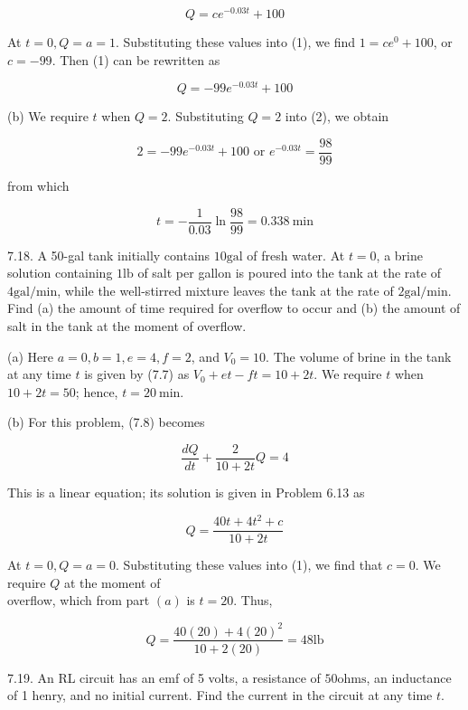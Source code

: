 \documentclass[10pt]{article}
\begin{document}
\begin{equation*}
Q=c e^{-0.03 t}+100 \tag{1}
\end{equation*}


At $t=0, Q=a=1$. Substituting these values into (1), we find $1=c e^{0}+100$, or $c=-99$. Then (1) can be rewritten as


\begin{equation*}
Q=-99 e^{-0.03 t}+100 \tag{2}
\end{equation*}


(b) We require $t$ when $Q=2$. Substituting $Q=2$ into (2), we obtain

$$
2=-99 e^{-0.03 t}+100 \text { or } e^{-0.03 t}=\frac{98}{99}
$$

from which

$$
t=-\frac{1}{0.03} \ln \frac{98}{99}=0.338 \mathrm{~min}
$$

7.18. A 50-gal tank initially contains $10 \mathrm{gal}$ of fresh water. At $t=0$, a brine solution containing $1 \mathrm{lb}$ of salt per gallon is poured into the tank at the rate of $4 \mathrm{gal} / \mathrm{min}$, while the well-stirred mixture leaves the tank at the rate of $2 \mathrm{gal} / \mathrm{min}$. Find (a) the amount of time required for overflow to occur and (b) the amount of salt in the tank at the moment of overflow.

(a) Here $a=0, b=1, e=4, f=2$, and $V_{0}=10$. The volume of brine in the tank at any time $t$ is given by (7.7) as $V_{0}+e t-f t=10+2 t$. We require $t$ when $10+2 t=50$; hence, $t=20 \mathrm{~min}$.

(b) For this problem, (7.8) becomes

$$
\frac{d Q}{d t}+\frac{2}{10+2 t} Q=4
$$

This is a linear equation; its solution is given in Problem 6.13 as


\begin{equation*}
Q=\frac{40 t+4 t^{2}+c}{10+2 t} \tag{1}
\end{equation*}


At $t=0, Q=a=0$. Substituting these values into (1), we find that $c=0$. We require $Q$ at the moment of\\
overflow, which from part $(a)$ is $t=20$. Thus,

$$
Q=\frac{40(20)+4(20)^{2}}{10+2(20)}=48 \mathrm{lb}
$$

7.19. An RL circuit has an emf of 5 volts, a resistance of $50 \mathrm{ohms}$, an inductance of 1 henry, and no initial current. Find the current in the circuit at any time $t$.
\end{document}
